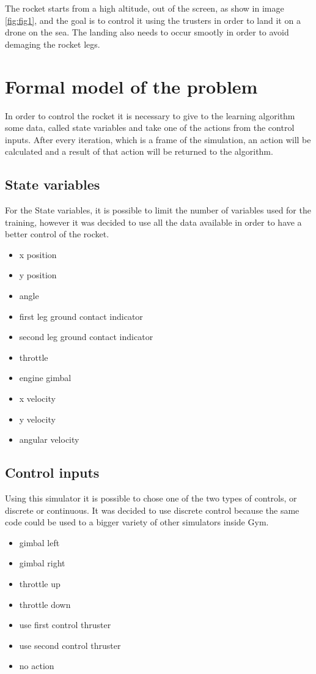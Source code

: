 \documentclass{article}
\begin{document}
The rocket starts from a high altitude, out of the screen, as show in image \ref{fig:fig1}, and the goal is to control it using the trusters in order to land it on a drone on the sea. The landing also needs to occur smootly in order to avoid demaging the rocket legs.

\section{Formal model of the problem}
In order to control the rocket it is necessary to give to the learning algorithm some data, called state variables and take one of the actions from the control inputs.
After every iteration, which is a frame of the simulation, an action will be calculated and a result of that action will be returned to the algorithm.

\subsection{State variables}
For the State variables, it is possible to limit the number of variables used for the training, however it was decided to use all the data available in order to have a better control of the rocket.

\begin{itemize}
	\item x position
    \item y position
    \item angle
    \item first leg ground contact indicator
    \item second leg ground contact indicator
    \item throttle
    \item engine gimbal
	\item x velocity
    \item y velocity
    \item angular velocity
\end{itemize}

\subsection{Control inputs}
Using this simulator it is possible to chose one of the two types of controls, or discrete or continuous. It was decided to use discrete control because the same code could be used to a bigger variety of other simulators inside Gym.

\begin{itemize}
	\item gimbal left
    \item gimbal right
    \item throttle up
    \item throttle down
    \item use first control thruster
    \item use second control thruster
    \item no action
\end{itemize}
\end{document}
